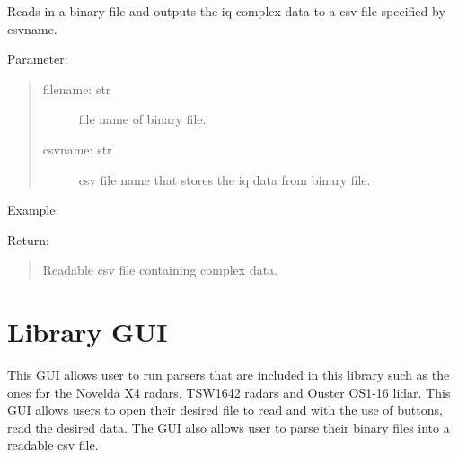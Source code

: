 \documentclass[letterpaper,10pt,english]{sphinxmanual}
\begin{document}
\begin{fulllineitems}
\label{\detokenize{TSW radar:TSW_IWR.readTSWdata}}
Reads in a binary file and outputs the iq complex data to a csv file specified by csvname.

Parameter:
\begin{quote}
\begin{description}
\item[{filename: str}] \leavevmode
file name of binary file.

\item[{csvname: str}] \leavevmode
csv file name that stores the iq data from binary file.

\end{description}
\end{quote}

Example:

\begin{sphinxVerbatim}[commandchars=\\\{\}]
\end{sphinxVerbatim}

Return:
\begin{quote}

Readable csv file containing complex data.
\end{quote}

\end{fulllineitems}



\section{Library GUI}
\label{\detokenize{Library GUI:library-gui}}\label{\detokenize{Library GUI::doc}}
This GUI allows user to run parsers that are included in this library such as the ones for the Novelda X4 radars, TSW1642 radars and Ouster OS1-16 lidar. This GUI allows users to
open their desired file to read and with the use of buttons, read the desired data. The GUI also allows user to parse their binary files into a readable csv file.
\end{document}
